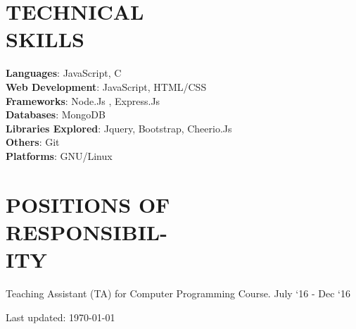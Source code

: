 \documentclass[margin]{res}
\begin{document}
\begin{resume}
\section{TECHNICAL \\ SKILLS}
  {\textbf{Languages}:} JavaScript, C\\
	{\textbf{Web Development}:} JavaScript, HTML/CSS\\
  {\textbf{Frameworks}:} Node.Js , Express.Js\\
  {\textbf{Databases}:} MongoDB\\
  {\textbf{Libraries Explored}:} Jquery, Bootstrap, Cheerio.Js\\
  {\textbf{Others}:} Git\\
  {\textbf{Platforms}:} GNU/Linux

\section{POSITIONS OF\\ RESPONSIBIL-\\ITY}
    Teaching Assistant (TA) for Computer Programming Course. \hfill July `16 - Dec `16\\

\begin{center}
  \begin{footnotesize}
    Last updated: \today \\
  \end{footnotesize}
\end{center}

\end{resume}
\end{document}
